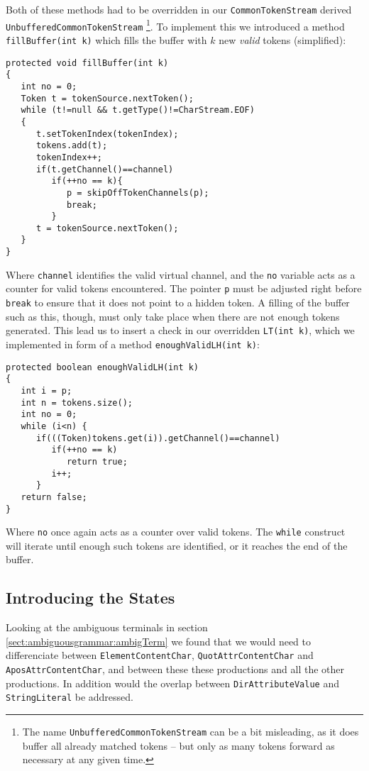 Both of these methods had to be overridden in our \verb!CommonTokenStream! derived \verb!UnbufferedCommonTokenStream! \footnote{The name \texttt{UnbufferedCommonTokenStream} can be a bit misleading, as it does buffer all already matched tokens -- but only as many tokens forward as necessary at any given time.}. To implement this we introduced a method \verb!fillBuffer(int k)! which fills the buffer with $k$ new \emph{valid} tokens (simplified):
\begin{Verbatim}
protected void fillBuffer(int k) 
{
   int no = 0;
   Token t = tokenSource.nextToken();
   while (t!=null && t.getType()!=CharStream.EOF) 
   {
      t.setTokenIndex(tokenIndex);
      tokens.add(t);
      tokenIndex++;
      if(t.getChannel()==channel)
         if(++no == k){
            p = skipOffTokenChannels(p);
            break;
         }
      t = tokenSource.nextToken();
   }
}
\end{Verbatim}
Where \verb!channel! identifies the valid virtual channel, and the \verb!no! variable acts as a counter for valid tokens encountered. The pointer \verb!p! must be adjusted right before \verb!break! to ensure that it does not point to a hidden token. A filling of the buffer such as this, though, must only take place when there are not enough tokens generated. This lead us to insert a check in our overridden \verb!LT(int k)!, which we implemented in form of a method \verb!enoughValidLH(int k)!:
\begin{Verbatim}
protected boolean enoughValidLH(int k)
{
   int i = p;
   int n = tokens.size();
   int no = 0;
   while (i<n) {
      if(((Token)tokens.get(i)).getChannel()==channel)
         if(++no == k)
            return true;
         i++;
      }
   return false;
}
\end{Verbatim}
Where \verb!no! once again acts as a counter over valid tokens. The \verb!while! construct will iterate until enough such tokens are identified, or it reaches the end of the buffer.

\subsection{Introducing the States}
\label{sect:rewriteGrammar:introduceStates}
Looking at the ambiguous terminals in section \ref{sect:ambiguousgrammar:ambigTerm} we found that we would need to differenciate between \verb!ElementContentChar!, \verb!QuotAttrContentChar! and \verb!AposAttrContentChar!, and between these these productions and all the other productions. In addition would the overlap between \verb!DirAttributeValue! and \verb!StringLiteral! be addressed. 

